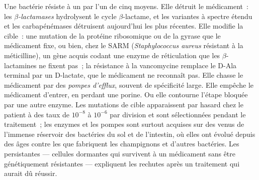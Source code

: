 \begin{definition}[La résistance]\label{def:b3:bacteriology:resistance}
Une bactérie résiste à un  par l'un de cinq moyens. Elle
détruit le médicament~: les \emph{$\beta$-lactamases} hydrolysent le
cycle $\beta$-lactame, et les variantes à spectre étendu et les
carbapénémases détruisent aujourd'hui les plus récentes. Elle modifie
la cible~: une mutation de la protéine ribosomique ou de la gyrase que
le médicament fixe, ou bien, chez le SARM (\emph{Staphylococcus aureus}
résistant à la méticilline), un gène acquis codant une enzyme de
réticulation que les $\beta$-lactamines ne fixent pas~; la résistance à
la vancomycine remplace le D-Ala terminal par un D-lactate, que le
médicament ne reconnaît pas. Elle chasse le médicament par des
\emph{pompes d'efflux}, souvent de spécificité large. Elle empêche le
médicament d'entrer, en perdant une porine. Ou elle contourne l'étape
bloquée par une autre enzyme. Les mutations de cible apparaissent par
hasard chez le patient à des taux de $10^{-8}$ à $10^{-6}$ par
division et sont sélectionnées pendant le traitement~; les enzymes et
les pompes sont surtout acquises sur des  venus de l'immense
réservoir des bactéries du sol et de l'intestin, où elles ont évolué
depuis des âges contre les  que fabriquent les
champignons et d'autres bactéries. Les persistantes --- cellules
dormantes qui survivent à un médicament sans être génétiquement
résistantes --- expliquent les rechutes après un traitement qui aurait
dû réussir.
\end{definition}


